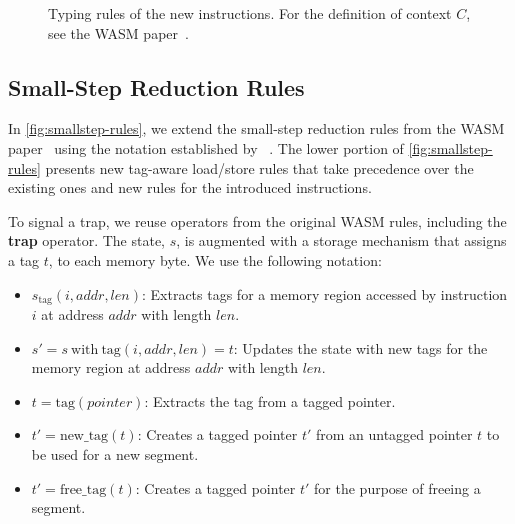 \begin{figure}[t]
    \begin{prooftree}
    \end{prooftree}
    \begin{prooftree}
    \end{prooftree}
    \begin{prooftree}
    \end{prooftree}
    \caption{Typing rules of the new instructions. For the definition of context $C$, see the \ac{WASM} paper~\cite{haas2017bringing}.}
    \label{fig:typing-rules}
\end{figure}

\subsection{Small-Step Reduction Rules}
\label{subsec:small-step-reduction-rules}

In \cref{fig:smallstep-rules}, we extend the small-step reduction rules from the WASM paper~\cite{haas2017bringing} using the notation established by \citeauthor*{plotkin1981structural}~\cite{plotkin1981structural}.
The lower portion of  \cref{fig:smallstep-rules} presents new tag-aware load/store rules that take precedence over the existing ones and new rules for the introduced instructions.

To signal a trap, we reuse operators from the original WASM rules, including the \textbf{trap} operator.
The state, $s$, is augmented with a storage mechanism that assigns a tag $t$, to each memory byte.
We use the following notation:

\begin{itemize}
    \item $s_{\text{tag}}(i, \mathit{addr}, \mathit{len})$: Extracts tags for a memory region accessed by instruction $i$ at address $\mathit{addr}$ with length $\mathit{len}$.
    \item $s' = s\ \text{with}\ \text{tag}(i, \mathit{addr}, \mathit{len}) = t$: Updates the state with new tags for the memory region at address $\mathit{addr}$ with length $\mathit{len}$.
    \item $t = \text{tag}(\mathit{pointer})$: Extracts the tag from a tagged pointer.
    \item $t' = \text{new\_tag}(t)$: Creates a tagged pointer $t'$ from an untagged pointer $t$ to be used for a new segment.
    \item $t' = \text{free\_tag}(t)$: Creates a tagged pointer $t'$ for the purpose of freeing a segment.
\end{itemize}

